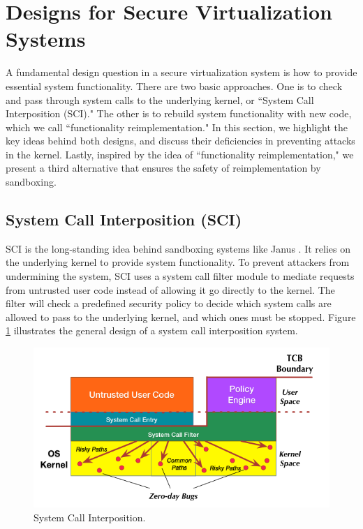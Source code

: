 \section{Designs for Secure Virtualization Systems}
\label{sec.design}


A fundamental design question in a secure virtualization system
is how to provide essential system functionality.
There are two basic approaches.
One is to check and pass through system calls to the underlying kernel,
or ``System Call Interposition (SCI)."
The other is to rebuild system functionality with new code,
which we call ``functionality reimplementation."
In this section, we highlight the key ideas behind both designs, and
discuss their deficiencies in preventing attacks 
in the kernel.
Lastly, inspired by the idea of ``functionality reimplementation," 
we present a third
alternative that ensures the safety of reimplementation by sandboxing.

\subsection{System Call Interposition (SCI)}
SCI is the long-standing idea behind sandboxing systems like Janus 
\cite{Janus0:96, Janus:99}. It relies on the underlying kernel
to provide system functionality. To prevent attackers from undermining the system,
SCI uses a system call filter module to mediate requests
from untrusted user code instead of allowing it go directly to the kernel.
The filter will check a predefined security policy to decide which system calls are
allowed to pass to the underlying kernel, and which ones must be stopped.
%
Figure \ref{fig:design_system_call_interposition} illustrates the general design
of a system call interposition system.

\begin{figure}%
\centering
\includegraphics[width=1.0\columnwidth]{diagram/Virtualization_Design_Model_03.png}
\caption{\small System Call Interposition.}
\label{fig:design_system_call_interposition}
\end{figure}

